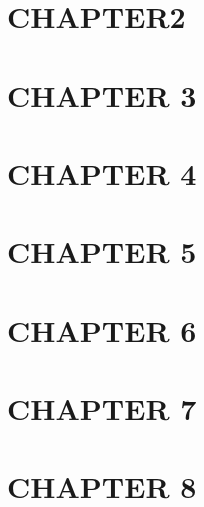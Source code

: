 



\cite{holmessmith3234}

\chapter{CHAPTER2}

\chapter{CHAPTER 3}


\chapter{CHAPTER 4}

\chapter{CHAPTER 5}


\chapter{CHAPTER 6}


\chapter{CHAPTER 7}


\chapter{CHAPTER 8}


